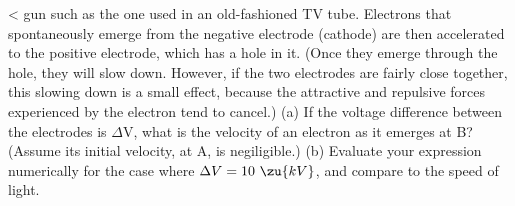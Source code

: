 <%
gun such as the one used in an old-fashioned TV tube. Electrons
that spontaneously emerge from the negative electrode
(cathode) are then accelerated to the positive electrode,
which has a hole in it. (Once they emerge through the hole,
they will slow down. However, if the two electrodes are
fairly close together, this slowing down is a small effect,
because the attractive and repulsive forces experienced by
the electron tend to cancel.) (a) If the voltage difference
between the electrodes is $\Delta $V, what is the velocity
of an electron as it emerges at B? (Assume its initial
velocity, at A, is negiligible.) (b) Evaluate your
expression numerically for the case where $\Delta V=10\ \zu{kV}$,
and compare to the speed of light.
